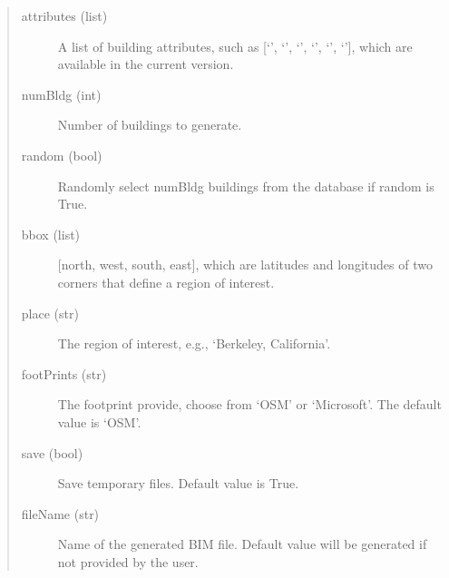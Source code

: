 \documentclass[letterpaper,10pt,english]{sphinxmanual}
\begin{document}
\begin{quote}\begin{description}
\item[{attributes (list)}] \leavevmode
\sphinxAtStartPar
A list of building attributes, such as {[}‘{\hyperref[\detokenize{common/user_manual/modules/roofClassifier:lbl-roofclassifier}]{}}’, ‘{\hyperref[\detokenize{common/user_manual/modules/occupancyClassifier:lbl-occupancyclassifier}]{}}’, ‘{\hyperref[\detokenize{common/user_manual/modules/softstoryClassifier:lbl-softstoryclassifier}]{}}’, ‘{\hyperref[\detokenize{common/user_manual/modules/foundationElevationClassifier:lbl-foundationelevationclassifier}]{}}’, ‘{\hyperref[\detokenize{common/user_manual/modules/yearClassifier:lbl-yearclassifier}]{}}’, ‘{\hyperref[\detokenize{common/user_manual/modules/nFloorDetector:lbl-nfloordetector}]{}}’{]}, which are available in the current version.

\item[{numBldg (int)}] \leavevmode
\sphinxAtStartPar
Number of buildings to generate.

\item[{random (bool)}] \leavevmode
\sphinxAtStartPar
Randomly select numBldg buildings from the database if random is True.

\item[{bbox (list)}] \leavevmode
\sphinxAtStartPar
{[}north, west, south, east{]}, which are latitudes and longitudes of two corners that define a region of interest.

\item[{place (str)}] \leavevmode
\sphinxAtStartPar
The region of interest, e.g., ‘Berkeley, California’.

\item[{footPrints (str)}] \leavevmode
\sphinxAtStartPar
The footprint provide, choose from ‘OSM’ or ‘Microsoft’. The default value is ‘OSM’.

\item[{save (bool)}] \leavevmode
\sphinxAtStartPar
Save temporary files. Default value is True.

\item[{fileName (str)}] \leavevmode
\sphinxAtStartPar
Name of the generated BIM file. Default value will be generated if not provided by the user.


\end{description}
\end{quote}
\end{document}
